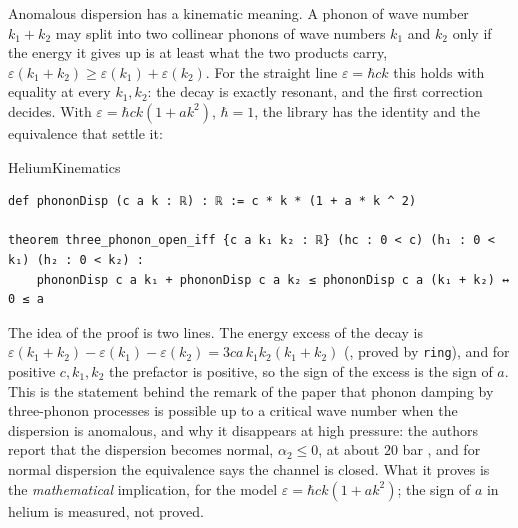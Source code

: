 Anomalous dispersion has a kinematic meaning.
A phonon of wave number $k_1+k_2$ may split into two collinear phonons of wave numbers $k_1$ and $k_2$ only if the energy it gives up is at least what the two products carry, $\varepsilon(k_1+k_2)\ge\varepsilon(k_1)+\varepsilon(k_2)$.
For the straight line $\varepsilon=\hbar ck$ this holds with equality at every $k_1,k_2$: the decay is exactly resonant, and the first correction decides.
With $\varepsilon=\hbar ck(1+ak^2)$, $\hbar=1$, the library has the identity and the equivalence that settle it:

\begin{leanbox}{HeliumKinematics}
\begin{lstlisting}[style=lean]
def phononDisp (c a k : ℝ) : ℝ := c * k * (1 + a * k ^ 2)

theorem three_phonon_open_iff {c a k₁ k₂ : ℝ} (hc : 0 < c) (h₁ : 0 < k₁) (h₂ : 0 < k₂) :
    phononDisp c a k₁ + phononDisp c a k₂ ≤ phononDisp c a (k₁ + k₂) ↔ 0 ≤ a
\end{lstlisting}
\end{leanbox}

The idea of the proof is two lines.
The energy excess of the decay is
$\varepsilon(k_1{+}k_2)-\varepsilon(k_1)-\varepsilon(k_2)=3ca\,k_1k_2(k_1+k_2)$ (, proved by \texttt{ring}), and for positive $c,k_1,k_2$ the prefactor is positive, so the sign of the excess is the sign of $a$.
This is the statement behind the remark of the paper that phonon damping by three-phonon processes is possible up to a critical wave number when the dispersion is anomalous, and why it disappears at high pressure: the authors report that the dispersion becomes normal, $\alpha_2\le0$, at about $20$ bar \cite{Godfrin2021}, and for normal dispersion the equivalence says the channel is closed.
What it proves is the \emph{mathematical} implication, for the model $\varepsilon=\hbar ck(1+ak^2)$; the sign of $a$ in helium is measured, not proved.

